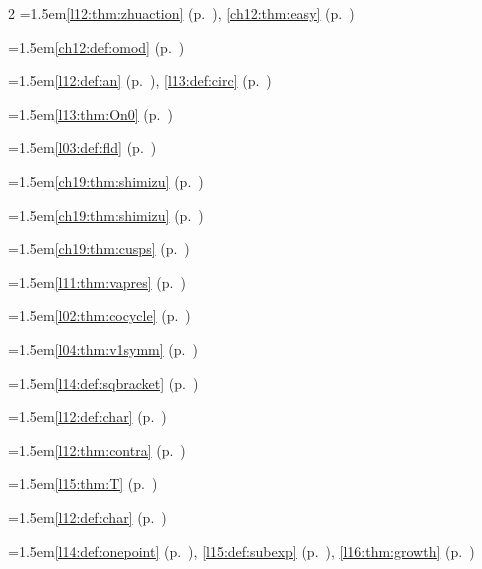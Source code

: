 \begin{multicols}{2}
\hangindent=1.5em\quad \ref{l12:thm:zhuaction} (p.~\pageref{l12:thm:zhuaction}), \ref{ch12:thm:easy} (p.~\pageref{ch12:thm:easy})\par
\hangindent=1.5em\quad \ref{ch12:def:omod} (p.~\pageref{ch12:def:omod})\par
\hangindent=1.5em\quad \ref{l12:def:an} (p.~\pageref{l12:def:an}), \ref{l13:def:circ} (p.~\pageref{l13:def:circ})\par
\hangindent=1.5em\quad \ref{l13:thm:On0} (p.~\pageref{l13:thm:On0})\par
\hangindent=1.5em\quad \ref{l03:def:fld} (p.~\pageref{l03:def:fld})\par
\hangindent=1.5em\quad \ref{ch19:thm:shimizu} (p.~\pageref{ch19:thm:shimizu})\par
\hangindent=1.5em\quad \ref{ch19:thm:shimizu} (p.~\pageref{ch19:thm:shimizu})\par
\hangindent=1.5em\quad \ref{ch19:thm:cusps} (p.~\pageref{ch19:thm:cusps})\par
\hangindent=1.5em\quad \ref{l11:thm:vapres} (p.~\pageref{l11:thm:vapres})\par
\hangindent=1.5em\quad \ref{l02:thm:cocycle} (p.~\pageref{l02:thm:cocycle})\par
\hangindent=1.5em\quad \ref{l04:thm:v1symm} (p.~\pageref{l04:thm:v1symm})\par
\hangindent=1.5em\quad \ref{l14:def:sqbracket} (p.~\pageref{l14:def:sqbracket})\par
\hangindent=1.5em\quad \ref{l12:def:char} (p.~\pageref{l12:def:char})\par
\hangindent=1.5em\quad \ref{l12:thm:contra} (p.~\pageref{l12:thm:contra})\par
\hangindent=1.5em\quad \ref{l15:thm:T} (p.~\pageref{l15:thm:T})\par
\hangindent=1.5em\quad \ref{l12:def:char} (p.~\pageref{l12:def:char})\par
\hangindent=1.5em\quad \ref{l14:def:onepoint} (p.~\pageref{l14:def:onepoint}), \ref{l15:def:subexp} (p.~\pageref{l15:def:subexp}), \ref{l16:thm:growth} (p.~\pageref{l16:thm:growth})\par

\end{multicols}
